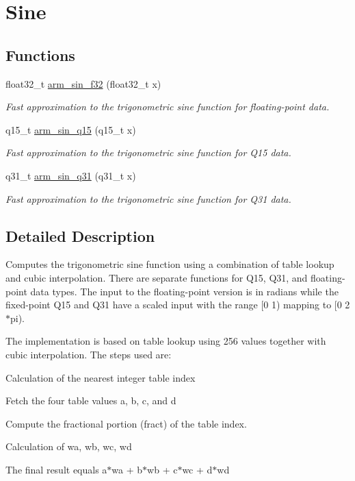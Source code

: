 \hypertarget{group__sin}{\section{Sine}
\label{group__sin}
}
\subsection*{Functions}
\begin{DoxyCompactItemize}
\item 
float32\-\_\-t \hyperlink{group__sin_gae164899c4a3fc0e946dc5d55555fe541}{arm\-\_\-sin\-\_\-f32} (float32\-\_\-t x)
\begin{DoxyCompactList}\small\item\em Fast approximation to the trigonometric sine function for floating-\/point data. \end{DoxyCompactList}\item 
q15\-\_\-t \hyperlink{group__sin_ga1fc6d6640be6cfa688a8bea0a48397ee}{arm\-\_\-sin\-\_\-q15} (q15\-\_\-t x)
\begin{DoxyCompactList}\small\item\em Fast approximation to the trigonometric sine function for Q15 data. \end{DoxyCompactList}\item 
q31\-\_\-t \hyperlink{group__sin_ga57aade7d8892585992cdc6375bd82f9c}{arm\-\_\-sin\-\_\-q31} (q31\-\_\-t x)
\begin{DoxyCompactList}\small\item\em Fast approximation to the trigonometric sine function for Q31 data. \end{DoxyCompactList}\end{DoxyCompactItemize}


\subsection{Detailed Description}
Computes the trigonometric sine function using a combination of table lookup and cubic interpolation. There are separate functions for Q15, Q31, and floating-\/point data types. The input to the floating-\/point version is in radians while the fixed-\/point Q15 and Q31 have a scaled input with the range \mbox{[}0 1) mapping to \mbox{[}0 2$\ast$pi).

The implementation is based on table lookup using 256 values together with cubic interpolation. The steps used are\-:
\begin{DoxyEnumerate}
\item Calculation of the nearest integer table index
\item Fetch the four table values a, b, c, and d
\item Compute the fractional portion (fract) of the table index.
\item Calculation of wa, wb, wc, wd
\item The final result equals {\ttfamily a$\ast$wa + b$\ast$wb + c$\ast$wc + d$\ast$wd}
\end{DoxyEnumerate}

